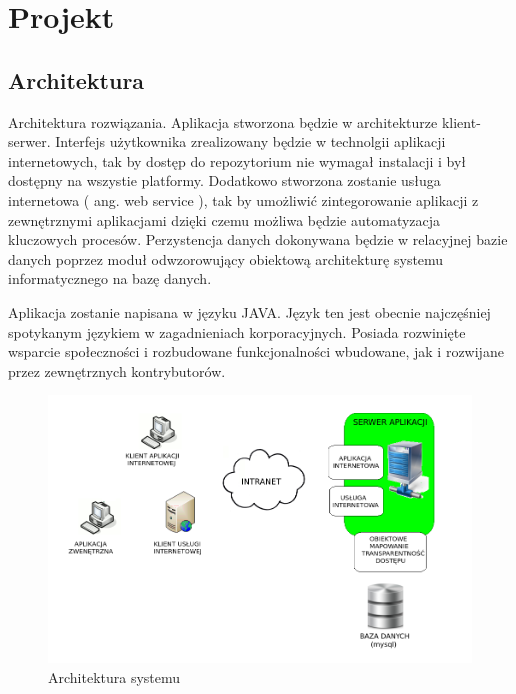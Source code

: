 \chapter{Projekt}
\section{Architektura}
Architektura rozwiązania. Aplikacja stworzona będzie w architekturze klient-serwer. Interfejs użytkownika zrealizowany będzie w technolgii aplikacji internetowych, tak by dostęp do repozytorium nie wymagał instalacji i był dostępny na wszystie platformy. Dodatkowo stworzona zostanie usługa internetowa ( ang. web service ), tak by umożliwić zintegorowanie aplikacji z zewnętrznymi aplikacjami dzięki czemu możliwa będzie automatyzacja kluczowych procesów. Perzystencja danych dokonywana będzie w relacyjnej bazie danych poprzez moduł odwzorowujący obiektową architekturę systemu informatycznego na bazę danych.

Aplikacja zostanie napisana w języku JAVA. Język ten jest obecnie najczęśniej spotykanym językiem w zagadnieniach korporacyjnych. Posiada rozwinięte wsparcie społeczności i rozbudowane funkcjonalności wbudowane, jak i rozwijane przez zewnętrznych kontrybutorów. 
\begin{figure}[h]
\centerline{\includegraphics[scale=0.5]{img/architektura.png}}
\caption{Architektura systemu}
\label{fig:architektura}
\end{figure}






